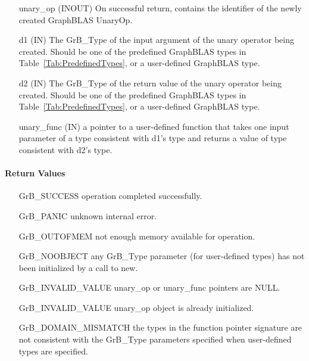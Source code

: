 \begin{itemize}[leftmargin=1.1in]
    \item[{\sf unary\_op}] ({\sf INOUT}) On successful return, contains the 
                           identifier of the newly created GraphBLAS UnaryOp.
    \item[{\sf d1}] ({\sf IN})  The {\sf GrB\_Type} of the input 
                           argument of the unary operator being created.  Should be 
                           one of the predefined GraphBLAS types in 
                           Table~\ref{Tab:PredefinedTypes}, or a user-defined GraphBLAS type.
    \item[{\sf d2}] ({\sf IN})  The {\sf GrB\_Type} of the return value of the unary 
                           operator being created.  Should be one of the predefined 
                           GraphBLAS types in Table~\ref{Tab:PredefinedTypes}, or a 
                           user-defined GraphBLAS type.
    \item[{\sf unary\_func}] ({\sf IN})  a pointer to a user-defined function that takes 
                           one input parameter of a type consistent with {\sf d1}'s type
                           and returns a value of type consistent with {\sf d2}'s type.  
\end{itemize}


\paragraph{Return Values}

\begin{itemize}[leftmargin=2.1in]
\item[{\sf GrB\_SUCCESS}]           operation completed successfully.
\item[{\sf GrB\_PANIC}]             unknown internal error.
\item[{\sf GrB\_OUTOFMEM}]          not enough memory available for operation.
\item[{\sf GrB\_NOOBJECT}]          any {\sf GrB\_Type} parameter (for
                                    user-defined types) has not been
                                    initialized by a call to {\sf new}.
\item[{\sf GrB\_INVALID\_VALUE}]    {\sf unary\_op} or {\sf unary\_func}
                                    pointers are {\sf NULL}.
\item[{\sf GrB\_INVALID\_VALUE}]    {\sf unary\_op} object is already initialized.
\item[{\sf GrB\_DOMAIN\_MISMATCH}]  the types in the function pointer signature
                                    are not consistent with the {\sf GrB\_Type}
                                    parameters specified when user-defined types
                                    are specified. 
\end{itemize}

